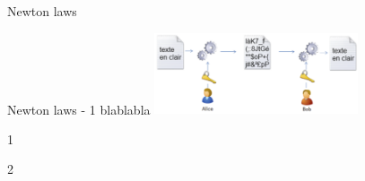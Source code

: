 \documentclass[12pt]{article}
\begin{document}
\begin{quiz}{Newton laws}
  \begin{multi}[shuffle=true, points=1]{Newton laws - 1}
    blablabla
    \includegraphics[width=6cm]{img/img3-20}
  \item* 1
  \item 2
\end{multi}

\end{quiz}
\end{document}
